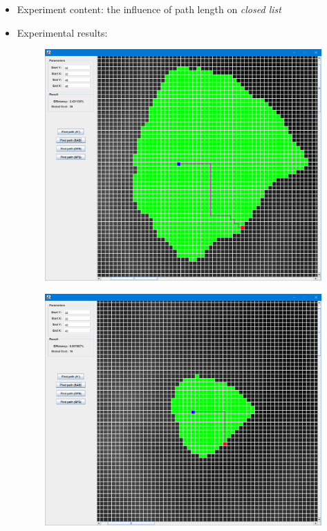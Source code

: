 \documentclass[
]{article}
\begin{document}
\begin{itemize}
  \begin{itemize}
  \item
    Experiment content: the influence of path length on \emph{closed
    list}
  \item
    Experimental results:

    \begin{figure}
    \centering
    \includegraphics{./images/image-20210523072848208.png}
    \caption{}
    \end{figure}

    \begin{figure}
    \centering
    \includegraphics{./images/image-20210523072945713.png}
    \caption{}
    \end{figure}
  \end{itemize}
\end{itemize}
\end{document}
